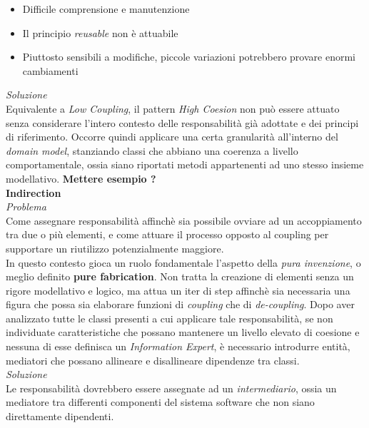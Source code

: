\documentclass{article}
\begin{document}
\begin{itemize}[label={-}]
    \itemsep0em
    \item Difficile comprensione e manutenzione
    \item Il principio \textit{reusable} non è attuabile
    \item Piuttosto sensibili a modifiche, piccole variazioni potrebbero provare enormi cambiamenti
\end{itemize}\vspace*{7pt}
\textit{Soluzione}\\
Equivalente a \textit{Low Coupling}, il pattern \textit{High Coesion} non può essere attuato senza considerare l'intero contesto delle responsabilità già adottate e dei principi di riferimento. Occorre quindi applicare una certa granularità all'interno del \textit{domain model}, stanziando classi che abbiano una coerenza a livello comportamentale, ossia siano riportati metodi appartenenti ad uno stesso insieme modellativo. \textbf{Mettere esempio ?}\vspace*{14pt}\\
\textbf{Indirection}\vspace*{7pt}\\
\textit{Problema}\\
Come assegnare responsabilità affinchè sia possibile ovviare ad un accoppiamento tra due o più elementi, e come attuare il processo opposto al coupling per supportare un riutilizzo potenzialmente maggiore.\vspace*{14pt}\\
In questo contesto gioca un ruolo fondamentale l'aspetto della \textit{pura invenzione}, o meglio definito \textbf{pure fabrication}. Non tratta la creazione di elementi senza un rigore modellativo e logico, ma attua un iter di step affinchè sia necessaria una figura che possa sia elaborare funzioni di \textit{coupling} che di \textit{de-coupling}. Dopo aver analizzato tutte le classi presenti a cui applicare tale responsabilità, se non individuate caratteristiche che possano mantenere un livello elevato di coesione e nessuna di esse definisca un \textit{Information Expert}, è necessario introdurre entità, mediatori che possano allineare e disallineare dipendenze tra classi.\vspace*{14pt}\\
\textit{Soluzione}\\
Le responsabilità dovrebbero essere assegnate ad un \textit{intermediario}, ossia un mediatore tra differenti componenti del sistema software che non siano direttamente dipendenti.\vspace*{14pt}\\
\end{document}
